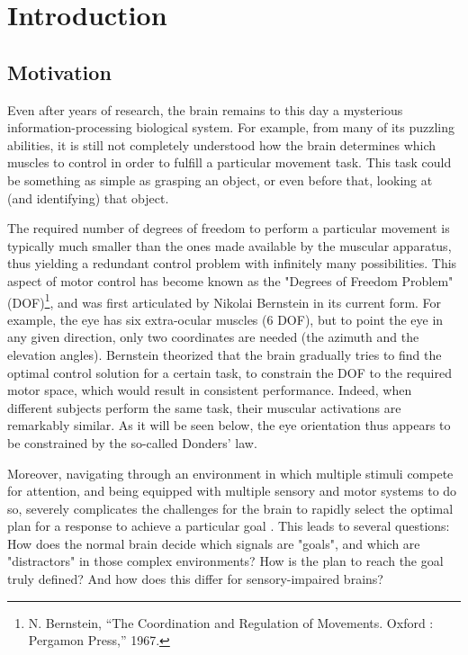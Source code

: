 
\chapter{Introduction}
\label{introduction}


\section{Motivation}
\label{cha1:motivation}
Even after years of research, the brain remains to this day a mysterious information-processing biological system. For example, from many of its puzzling abilities, it is still not completely understood how the brain determines which muscles to control in order to fulfill a particular movement task. This task could be something as simple as grasping an object, or even before that, looking at (and identifying) that  object.

The required number of degrees	 of freedom to perform a particular movement is typically much smaller than the ones made available by the muscular apparatus, thus yielding a redundant control problem with infinitely many possibilities. This aspect of motor control has become known as the "Degrees of Freedom Problem" (DOF)\footnote{N. Bernstein, “The Coordination and Regulation of Movements. Oxford : Pergamon Press,” 1967.}, and was first articulated by Nikolai Bernstein in its current form. For example, the eye has six extra-ocular muscles (6 DOF), but to point the eye in any given direction, only two coordinates are needed (the azimuth and the elevation angles). Bernstein theorized that the brain gradually tries to find the optimal control solution for a certain task, to constrain the DOF to the required motor space, which would result in consistent performance. Indeed, when different subjects perform the same task, their muscular activations are remarkably similar. As it will be seen below, the eye orientation thus appears to be constrained by the so-called Donders' law.

Moreover, navigating through an environment in which multiple  stimuli compete for attention, and being equipped with multiple sensory and motor systems to do so, severely complicates the challenges for the brain to rapidly select the optimal plan for a response to achieve a particular goal \cite{johnpage}. This leads to several questions: How does the normal brain decide which signals are "goals", and which are "distractors" in those complex environments? How is the plan to reach the goal truly defined? And how does this differ for sensory-impaired brains? 

